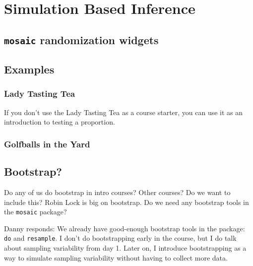 \chapter{Simulation Based Inference}




\section{\texttt{mosaic} randomization widgets}

\section{Examples}
\subsection{Lady Tasting Tea}
If you don't use the Lady Tasting Tea as a course starter, you can use it as 
an introduction to testing a proportion.

\subsection{Golfballs in the Yard}



\section{Bootstrap?}

Do any of us do bootstrap in intro courses?  Other courses?  Do we want to include this?
Robin Lock is big on bootstrap.  Do we need any bootstrap tools in the \verb!mosaic! 
package?

Danny responds: We already have good-enough bootstrap tools in the
package: \texttt{do} and \texttt{resample}.  I don't do bootstrapping
early in the course, but I do talk about sampling variability from day
1.  Later on, I introduce bootstrapping as a way to simulate sampling
variability without having to collect more data.
